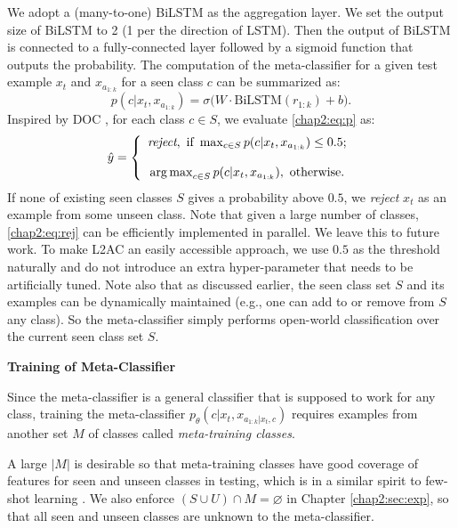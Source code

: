 We adopt a (many-to-one) BiLSTM \cite{hochreiter1997long,schuster1997bidirectional} as the aggregation layer.
We set the output size of BiLSTM to 2 (1 per the direction of LSTM). 
Then the output of BiLSTM is connected to a fully-connected layer followed by a sigmoid function that outputs the probability.
The computation of the meta-classifier for a given test example $x_t$ and $x_{a_{1:k}}$ for a seen class $c$ can be summarized as: 
\begin{equation}
    \label{chap2:eq:p}
p(c|x_t, x_{a_{1:k}} )=\sigma\big(W\cdot \text{BiLSTM}(r_{1:k})+b\big).
\end{equation}
Inspired by DOC \cite{shu-xu-liu:2017:EMNLP2017}, 
for each class $c \in S$, we evaluate \ref{chap2:eq:p} as:
\begin{equation} 
    \label{chap2:eq:rej}
        \hat{y} = \left\{
        \begin{array}{c}
        \textit{reject}, \text{ if } \max_{c \in S} p(c|x_t, x_{a_{1:k}} ) \le 0.5 ;\\
        \\
        \operatorname*{arg\,max}_{c \in S} p(c|x_t, x_{a_{1:k}} ) ,\text{ otherwise.}
        \end{array} \right.
\end{equation}
If none of existing seen classes $S$ gives a probability above $0.5$, we \emph{reject} $x_t$ as an example from some unseen class.
Note that given a large number of classes, \ref{chap2:eq:rej} can be efficiently implemented in parallel. We leave this to future work.
To make L2AC an easily accessible approach, we use $0.5$ as the threshold naturally and do not introduce an extra hyper-parameter that needs to be artificially tuned.
Note also that as discussed earlier, the seen class set $S$ and its examples can be dynamically maintained (e.g., one can add to or remove from $S$ any class). So the meta-classifier simply performs open-world classification over the current seen class set $S$.

\textbf{Training of Meta-Classifier}
\label{chap2:sec:train}

Since the meta-classifier is a general classifier that is supposed to work for any class,
training the meta-classifier $p_\theta(c|x_t, x_{a_{1:k}|x_t, c} )$
requires examples from another set $M$ of classes called \textit{meta-training classes}.

A large $|M|$ is desirable so that meta-training classes have good coverage of features for seen and unseen classes in testing, which is in a similar spirit to few-shot learning \cite{lake2011one}. 
We also enforce $ (S\cup U) \cap M=\varnothing$ in Chapter \ref{chap2:sec:exp}, so that all seen and unseen classes are unknown to the meta-classifier.

